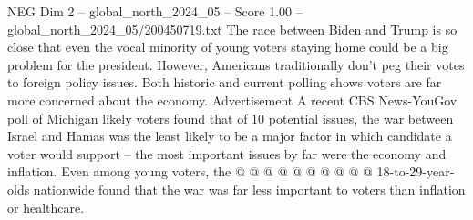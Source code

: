 \begin{textsample}{NEG Dim 2 – global\_north\_2024\_05 – Score 1.00 – global\_north\_2024\_05/200450719.txt}
The race between Biden and Trump is so close that even the vocal minority of young voters staying home could be a big problem for the president.
However, Americans traditionally don't peg their votes to foreign policy issues.
Both historic and current polling shows voters are far more concerned about the economy.
Advertisement A recent CBS News-YouGov poll of Michigan likely voters found that of 10 potential issues, the war between Israel and Hamas was the least likely to be a major factor in which candidate a voter would support -- the most important issues by far were the economy and inflation.
Even among young voters, the @ @ @ @ @ @ @ @ @ @ 18-to-29-year-olds nationwide found that the war was far less important to voters than inflation or healthcare.

\end{textsample}
